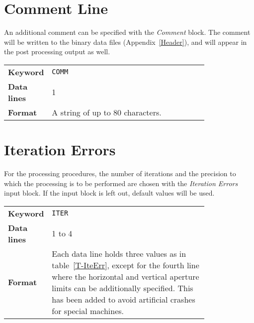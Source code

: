 \section{Comment Line} \label{ComLin}

An additional comment can be specified with the \textit{Comment} block.
The comment will be written to the binary data files (Appendix~\ref{Header}), and will appear in the post processing output as well.

\bigskip
\begin{tabular}{@{}lp{0.8\linewidth}}
    \textbf{Keyword}    & \texttt{COMM}\index{COMM}\index{comment} \\
    \textbf{Data lines} & 1 \\
    \textbf{Format}     & A string of up to 80 characters.
\end{tabular}

\section{Iteration Errors} \label{IteErr}

For the processing procedures, the number of iterations and the precision to which the processing is to be performed are chosen with the \textit{Iteration Errors} input block.
If the input block is left out, default values will be used.

\bigskip
\begin{tabular}{@{}lp{0.8\linewidth}}
    \textbf{Keyword}    & \texttt{ITER}\index{ITER} \\
    \textbf{Data lines} & 1 to 4 \\
    \textbf{Format}     & Each data line holds three values as in table~\ref{T-IteErr}, except for the fourth line where the horizontal and vertical aperture limits can be additionally specified. This has been added to avoid artificial crashes for special machines.
\end{tabular}

